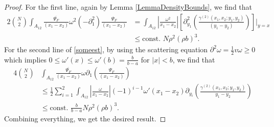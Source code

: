 \documentclass[a4paper,11pt]{article}
\newcommand{\abs}[1]{\left\lvert #1 \right\rvert}
\numberwithin{equation}{section}
\begin{document}
\begin{proof}
		For the first line, again by Lemma \ref{LemmaDensityBounds}, we find that \begin{equation}
		\begin{aligned}
		2\binom{N}{2}\int_{A_{12}}\frac{\overline{\Psi_F}}{(x_1-x_2)}\omega^2(-\partial^2_1)\frac{\Psi_F}{(x_1-x_2)}&=\int_{A_{12}}\abs{\frac{\omega^2}{x_1-x_2}}\left[\partial^2_{y_1}\left(\frac{\gamma^{(2)}(x_1,x_2;y_1,y_2)}{(y_1-y_2)}\right)\right]\Big\rvert_{y=x}\\&\leq\text{const. }N\rho^2 (\rho b)^3.
		\end{aligned}
		\end{equation}
		For the second line of \eqref{someest}, by using the scattering equation $ \partial^2\omega=\frac{1}{2}v\omega\geq0 $ which implies $ 0\leq\omega'(x)\leq \omega'(b)=\frac{b}{b-a} $ for $ \abs{x}<b $, we find that \begin{equation}
		\begin{aligned}
		4\binom{N}{2}&\int_{A_{12}}\frac{\overline{\Psi_F}}{(x_1-x_2)}\omega\partial_1\left(\frac{\Psi_F}{(x_1-x_2)}\right)\\&\leq\frac12\sum_{i=1}^{2}\int_{A_{12}}\abs{\frac{\omega}{x_1-x_2}}(-1)^{i-1}\omega'(x_1-x_2)\partial_{y_i}\left(\frac{\gamma^{(2)}(x_1,x_2;y_1,y_2)}{y_1-y_2}\right)\\
		&\leq \text{const. }\frac{b}{b-a}N\rho^2(\rho b)^3.
		\end{aligned}
		\end{equation}
		Combining everything, we get the desired result.

	\end{proof}
\end{document}
